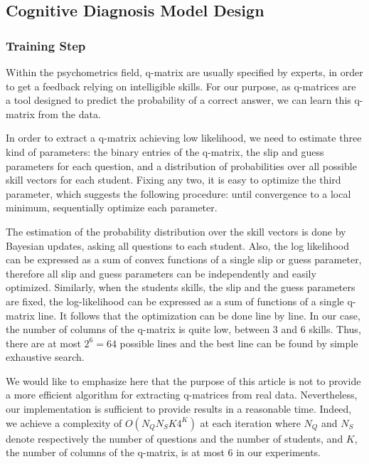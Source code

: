 \documentclass{sig-alternate}
\newcommand\alert[1]{\textcolor{red}{#1}}
\begin{document}
\subsection{Cognitive Diagnosis Model Design}

\subsubsection{Training Step}

Within the psychometrics field, q-matrix are usually specified by experts, in order to get a feedback relying on intelligible skills. For our purpose, as q-matrices are a tool designed to predict the probability of a correct answer, we can learn this q-matrix from the data.

In order to extract a q-matrix achieving low likelihood, we need to estimate three kind of parameters: the binary entries of the q-matrix, the slip and guess parameters for each question, and a distribution of probabilities over all possible skill vectors for each student. Fixing any two, it is easy to optimize the third parameter, which suggests the following procedure: until convergence to a local minimum, sequentially optimize each parameter.

The estimation of the probability distribution over the skill vectors is done by Bayesian updates, asking all questions to each student. Also, the log likelihood can be expressed as a sum of convex functions of a single slip or guess parameter, therefore all slip and guess parameters can be independently and easily optimized.  Similarly, when the students skills, the slip and the guess parameters are fixed, the log-likelihood can be expressed as a sum of functions of a single q-matrix line. It follows that the optimization can be done line by line. In our case, the number of columns of the q-matrix is quite low, between 3 and 6 skills. Thus, there are at most $2^6 = 64$ possible lines and the best line can be found by simple exhaustive search.


We would like to emphasize here that the purpose of this article is not to provide a more efficient algorithm for extracting q-matrices from real data. Nevertheless, our implementation is sufficient to provide results in a reasonable time. Indeed, we achieve a complexity of $O(N_Q N_S K 4^K)$ at each iteration where $N_Q$ and $N_S$ denote respectively the number of questions and the number of students, and $K$, the number of columns of the q-matrix, is at most 6 in our experiments.
\end{document}
